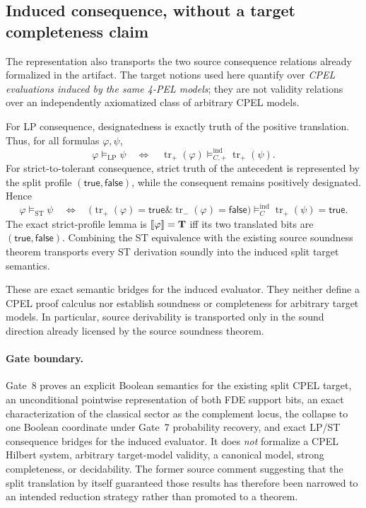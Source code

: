 \subsection{Induced consequence, without a target completeness claim}

The representation also transports the two source consequence relations already
formalized in the artifact.  The target notions used here quantify over
\emph{CPEL evaluations induced by the same 4-PEL models}; they are not validity
relations over an independently axiomatized class of arbitrary CPEL models.

For LP consequence, designatedness is exactly truth of the positive translation.
Thus, for all formulas \(\varphi,\psi\),
\[
  \boxed{
  \varphi\models_{\mathrm{LP}}\psi
  \quad\Longleftrightarrow\quad
  \operatorname{tr}_{+}(\varphi)
  \models^{\mathrm{ind}}_{C,+}
  \operatorname{tr}_{+}(\psi).
  }
\]
For strict-to-tolerant consequence, strict truth of the antecedent is represented by
the split profile \((\mathsf{true},\mathsf{false})\), while the consequent remains
positively designated.  Hence
\[
  \boxed{
  \varphi\models_{\mathrm{ST}}\psi
  \quad\Longleftrightarrow\quad
  \bigl(\operatorname{tr}_{+}(\varphi)=\mathsf{true}
  \mathbin{\&}
  \operatorname{tr}_{-}(\varphi)=\mathsf{false}\bigr)
  \models^{\mathrm{ind}}_{C}
  \operatorname{tr}_{+}(\psi)=\mathsf{true}.
  }
\]
The exact strict-profile lemma is
\(\mathopen{[\![}\varphi\mathclose{]\!]}=\mathbf{T}\) iff its two translated bits are
\((\mathsf{true},\mathsf{false})\).  Combining the ST equivalence with the existing
source soundness theorem transports every ST derivation soundly into the induced
split target semantics.

These are exact semantic bridges for the induced evaluator.  They neither define a
CPEL proof calculus nor establish soundness or completeness for arbitrary target
models.  In particular, source derivability is transported only in the sound
direction already licensed by the source soundness theorem.

\paragraph{Gate boundary.}
Gate~8 proves an explicit Boolean semantics for the existing split CPEL target, an
unconditional pointwise representation of both FDE support bits, an exact
characterization of the classical sector as the complement locus, the collapse to
one Boolean coordinate under Gate~7 probability recovery, and exact LP/ST
consequence bridges for the induced evaluator.  It does \emph{not} formalize a CPEL
Hilbert system, arbitrary target-model validity, a canonical model, strong
completeness, or decidability.  The former source comment suggesting that the split
translation by itself guaranteed those results has therefore been narrowed to an
intended reduction strategy rather than promoted to a theorem.

